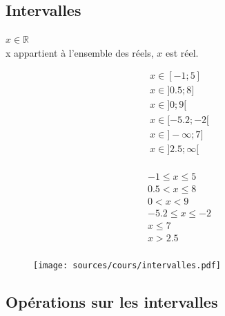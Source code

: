 \documentclass[paper=a4, fontsize=9pt]{scrartcl} %
\begin{document}
\subsection{Intervalles}
\begin{Definition}{$x \in \mathbb{R}$}\\
  x appartient à l'ensemble des réels, $x$ est réel.
\end{Definition}
\begin{multicols}{3}

  \begin{eqnarray*}
    x \in [-1      ; 5     ]\\
    x \in ] 0.5    ; 8     ]\\
    x \in ] 0      ; 9     [\\
    x \in [-5.2    ; -2    [\\
    x \in ]-\infty ; 7     ]\\
    x \in ] 2.5    ; \infty[\\
  \end{eqnarray*}

  \begin{eqnarray*}
    -1   \leq x \leq  5\\
    0.5  <    x \leq  8\\
    0    <    x <     9\\
    -5.2 \leq x \leq -2\\
    x    \leq 7\\
    x    > 2.5\\
  \end{eqnarray*}

  \begin{figure}[H]
    \centering
    \texttt{[image: sources/cours/intervalles.pdf]}
  \end{figure}
\end{multicols}


\subsection{Opérations sur les intervalles}
\end{document}
